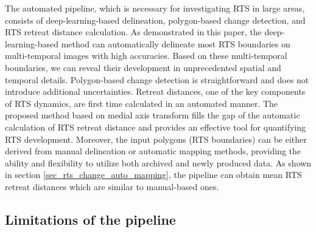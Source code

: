 \documentclass[authoryear,preprint,review,12pt]{elsarticle}
\begin{document}
The automated pipeline, which is necessary for investigating RTS in large areas, consists of deep-learning-based delineation, polygon-based change detection, and RTS retreat distance calculation. 
As demonstrated in this paper, the deep-learning-based method can automatically delineate most RTS boundaries on multi-temporal images with high accuracies.
Based on these multi-temporal boundaries, we can reveal their development in unprecedented spatial and temporal details. 
Polygon-based change detection is straightforward and does not introduce additional uncertainties. 
Retreat distances, one of the key components of RTS dynamics, are first time calculated in an automated manner. 
The proposed method based on medial axis transform fills the gap of the automatic calculation of RTS retreat distance and provides an effective tool for quantifying RTS development. 
Moreover, the input polygons (RTS boundaries) can be either derived from manual delineation or automatic mapping methods, providing the ability and flexibility to utilize both archived and newly produced data.
As shown in section \ref{sec_rts_change_auto_mapping}, the pipeline can obtain mean RTS retreat distances which are similar to manual-based ones. 





\subsection{Limitations of the pipeline}
\label{sec_diss_limitations}
\end{document}
